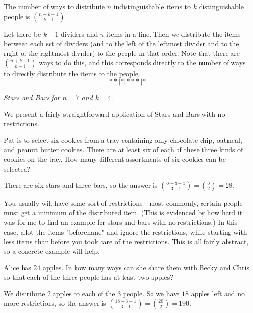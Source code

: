 \begin{theo}
The number of ways to distribute $n$ indistinguishable items to $k$ distinguishable people is $\binom{n+k-1}{k-1}.$
\end{theo}

\begin{pro}
Let there be $k-1$ dividers and $n$ items in a line. Then we distribute the items between each set of dividers (and to the left of the leftmost divider and to the right of the rightmost divider) to the people in that order. Note that there are $\binom{n+k-1}{k-1}$ ways to do this, and this corresponds directly to the number of ways to directly distribute the items to the people.
\[**|*|***|*\]
\begin{center}
    \textit{Stars and Bars for $n=7$ and $k=4.$}
\end{center}
\end{pro}

We present a fairly straightforward application of Stars and Bars with no restrictions.

\begin{exam}[AMC 10A 2003/21]
Pat is to select six cookies from a tray containing only chocolate chip, oatmeal, and peanut butter cookies. There are at least six of each of these three kinds of cookies on the tray. How many different assortments of six cookies can be selected?
\end{exam}

\begin{sol}
There are six stars and three bars, so the answer is $\binom{6+3-1}{3-1}=\binom{8}{2}=28.$
\end{sol}

You usually will have some sort of restrictions - most commonly, certain people must get a minimum of the distributed item. (This is evidenced by how hard it was for me to find an example for stars and bars with no restrictions.) In this case, allot the items "beforehand" and ignore the restrictions, while starting with less items than before you took care of the restrictions. This is all fairly abstract, so a concrete example will help.

\begin{exam}[AMC 8 2019/25]
Alice has $24$ apples. In how many ways can she share them with Becky and Chris so that each of the three people has at least two apples?
\end{exam}

\begin{sol}
We distribute $2$ apples to each of the $3$ people. So we have $18$ apples left and no more restrictions, so the answer is $\binom{18+3-1}{3-1}=\binom{20}{2}=190.$
\end{sol}

